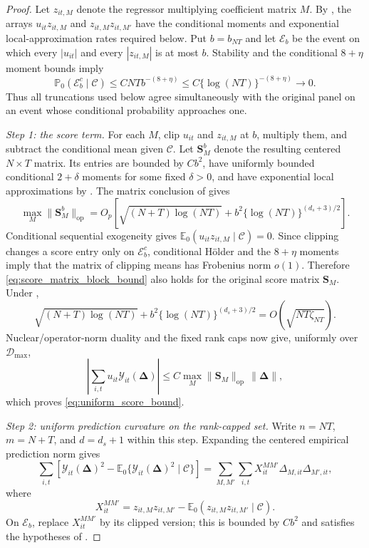 \documentclass[11pt]{article}
\numberwithin{equation}{section}
\theoremstyle{remark}
\newcommand{\Ezero}{\mathbb E_0}
\newcommand{\Pzero}{\mathbb P_0}
\newcommand{\op}{\operatorname{op}}
\newcommand{\bDelta}{\bm\Delta}
\newcommand{\calD}{\mathcal D}
\begin{document}
\begin{proof}
Let $z_{it,M}$ denote the regressor multiplying coefficient matrix $M$. By , the arrays $u_{it}z_{it,M}$ and $z_{it,M}z_{it,M'}$ have the conditional moments and exponential local-approximation rates required below. Put $b=b_{NT}$ and let $\mathcal E_b$ be the event on which every $|u_{it}|$ and every $|z_{it,M}|$ is at most $b$. Stability and the conditional $8+\eta$ moment bounds imply
\[
\Pzero(\mathcal E_b^c\mid\mathscr C)
\le
CNT b^{-(8+\eta)}
\le
C\{\log(NT)\}^{-(8+\eta)}
\longrightarrow0.
\]
Thus all truncations used below agree simultaneously with the original panel on an event whose conditional probability approaches one.

\emph{Step 1: the score term.}
For each $M$, clip $u_{it}$ and $z_{it,M}$ at $b$, multiply them, and subtract the conditional mean given $\mathscr C$. Let $\bm S_M^{b}$ denote the resulting centered $N\times T$ matrix. Its entries are bounded by $Cb^2$, have uniformly bounded conditional $2+\delta$ moments for some fixed $\delta>0$, and have exponential local approximations by . The matrix conclusion of  gives
\begin{equation}
\label{eq:score_matrix_block_bound}
\max_M\|\bm S_M^{b}\|_{\op}
=
O_p\!\left[
\sqrt{(N+T)\log(NT)}
+b^2\{\log(NT)\}^{(d_s+3)/2}
\right].
\end{equation}
Conditional sequential exogeneity gives $\Ezero(u_{it}z_{it,M}\mid\mathscr C)=0$. Since clipping changes a score entry only on $\mathcal E_b^c$, conditional H\"older and the $8+\eta$ moments imply that the matrix of clipping means has Frobenius norm $o(1)$. Therefore \eqref{eq:score_matrix_block_bound} also holds for the original score matrix $\bm S_M$. Under ,
\[
\sqrt{(N+T)\log(NT)}
+b^2\{\log(NT)\}^{(d_s+3)/2}
=
O\!\left(\sqrt{NT\zeta_{NT}}\right).
\]
Nuclear/operator-norm duality and the fixed rank caps now give, uniformly over $\calD_{\max}$,
\[
\left|
\sum_{i,t}u_{it}\mathcal Y_{it}(\bDelta)
\right|
\le
C\max_M\|\bm S_M\|_{\op}\,\|\bDelta\|,
\]
which proves \eqref{eq:uniform_score_bound}.

\emph{Step 2: uniform prediction curvature on the rank-capped set.}
Write $n=NT$, $m=N+T$, and $d=d_s+1$ within this step. Expanding the centered empirical prediction norm gives
\begin{equation}
\label{eq:quadratic_pair_expansion}
\sum_{i,t}
\left[
\mathcal Y_{it}(\bDelta)^2
-
\Ezero\{\mathcal Y_{it}(\bDelta)^2\mid\mathscr C\}
\right]
=
\sum_{M,M'}\sum_{i,t}
X_{it}^{MM'}\Delta_{M,it}\Delta_{M',it},
\end{equation}
where
\[
X_{it}^{MM'}
=
z_{it,M}z_{it,M'}
-
\Ezero(z_{it,M}z_{it,M'}\mid\mathscr C).
\]
On $\mathcal E_b$, replace $X_{it}^{MM'}$ by its clipped version; this is bounded by $Cb^2$ and satisfies the hypotheses of .


\end{proof}
\end{document}
